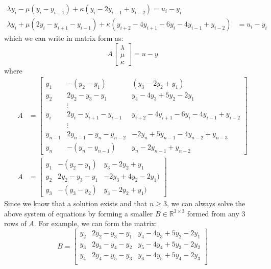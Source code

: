 \documentclass[12pt]{exam}
\begin{document}
\begin{questions}
\begin{solution}
\begin{enumerate}[label=(\alph*)]
\begin{align*}
      \lambda y_i - \mu(y_i - y_{i-1}) + \kappa(y_i - 2y_{i-1} + y_{i-2}) = u_i - y_i \tag{$i = n$} \\
      \lambda y_i + \mu(2y_i - y_{i+1} - y_{i-1}) + \kappa (y_{i+2} - 4y_{i+1} - 6y_i - 4y_{i-1} + y_{i-2}) &= u_i - y_i \tag{otherwise}
    \end{align*}
    which we can write in matrix form as:
    \[
      A\begin{bmatrix}
        \lambda \\ \mu \\ \kappa
      \end{bmatrix} = u - y
    \]
    where 
    \begin{align*}
      A &= \begin{bmatrix}
        y_1 & -(y_{2} - y_1) & (y_{3} - 2y_{2} + y_1) \\
        y_2 & 2y_2 - y_{3} - y_{1} & y_{4} - 4y_{3} + 5y_{2} -2y_{1} \\
        & \vdots & \\
        y_i & 2y_i - y_{i+1} - y_{i-1} & y_{i+2} - 4y_{i+1} - 6y_i - 4y_{i-1} + y_{i-2} \\
        & \vdots & \\
        y_{n-1} & 2y_{n-1} - y_{n} - y_{n-2} & -2y_{n} + 5y_{n-1} -4y_{n-2} + y_{n-3} \\
        y_n & -(y_n - y_{n-1}) & y_n - 2y_{n-1} + y_{n-2}
      \end{bmatrix}  \tag{$n > 3$} \\
      A &= 
      \begin{bmatrix}
        y_1 & -(y_{2} - y_1) & y_{3} - 2y_{2} + y_1 \\
        y_2 & 2y_2 - y_{3} - y_{1} & -2y_3 + 4y_2 - 2y_1) \\
        y_3 & -(y_3 - y_{2}) & y_3 - 2y_{2} + y_1)
      \end{bmatrix} \tag{$n = 3$}
    \end{align*}
    Since we know that a solution exists and that $n \geq 3$, we can always solve the above system of equations by forming a smaller $B \in \mathbb{R}^{3 \times 3}$ formed from any $3$ rows of $A$. For example, we can form the matrix:
    \[
      B =
        \begin{bmatrix}
          y_2 & 2y_2 - y_{3} - y_{1} & y_{4} - 4y_{3} + 5y_{2} -2y_{1} \\
          y_3 & 2y_3 - y_{4} - y_{2} & y_{5} - 4y_{4} + 5y_{3} -2y_{2} \\
          y_4 & 2y_4 - y_{5} - y_{3} & y_{6} - 4y_{5} + 5y_{4} -2y_{3} \\

\end{bmatrix}\]
\end{enumerate}
\end{solution}
\end{questions}
\end{document}
